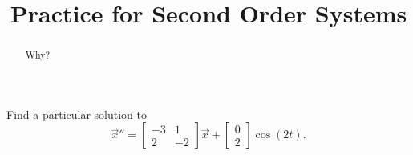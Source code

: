 \documentclass{ximera}
\title{Practice for Second Order Systems}
\begin{document}
\begin{abstract}
Why?
\end{abstract}
\maketitle

\begin{exercise}
    Find a particular solution to
    \begin{equation*}
        {\vec{x}}'' =
        \begin{bmatrix}
            -3 & 1 \\
            2 & -2
        \end{bmatrix}
        \vec{x}  + 
        \begin{bmatrix}
            0 \\ 
            2
        \end{bmatrix}
        \cos (2 t) .
    \end{equation*}
\end{exercise}
\end{document}
